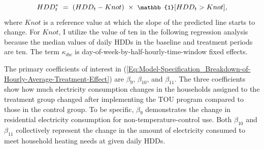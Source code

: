 \begin{equation}
\small
HDD_{t}^{*} \ = \ (HDD_{t} - Knot) \ \times \ \mathbb{1}[HDD_{t} > Knot],
\end{equation}
where $Knot$ is a reference value at which the slope of the predicted line starts to change. For $Knot$, I utilize the value of ten in the following regression analysis because the median values of daily HDDs in the baseline and treatment periods are ten. The term $\kappa_{dw}$ is day-of-week-by-half-hourly-time-window fixed effects. 

The primary coefficients of interest in (\ref{Eq:Model-Specification_Breakdown-of-Hourly-Average-Treatment-Effect}) are $\beta_{9}$, $\beta_{10}$, and $\beta_{11}$. The three coefficients show how much electricity consumption changes in the households assigned to the treatment group changed after implementing the TOU program compared to those in the control group. To be specific, $\beta_{9}$ demonstrates the change in residential electricity consumption for non-temperature-control use. Both $\beta_{10}$ and $\beta_{11}$ collectively represent the change in the amount of electricity consumed to meet household heating needs at given daily HDDs. 


